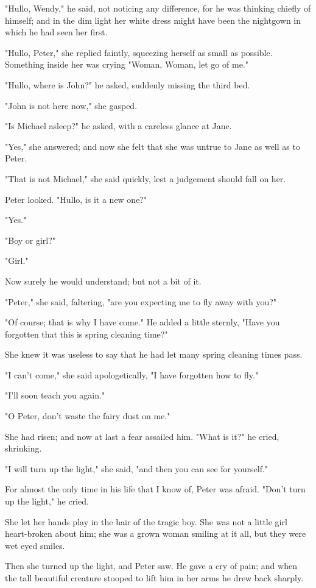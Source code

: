 "Hullo, Wendy," he said, not noticing any difference,
for he was thinking chiefly of himself;
and in the dim light her white dress might have been the nightgown in which he had seen her first.

"Hullo, Peter," she replied faintly, squeezing herself as small as possible.
Something inside her was crying "Woman, Woman, let go of me."

"Hullo, where is John?\@" he asked, suddenly missing the third bed.

"John is not here now," she gasped.

"Is Michael asleep?\@" he asked, with a careless glance at Jane.

"Yes," she answered;
and now she felt that she was untrue to Jane as well as to Peter.

"That is not Michael," she said quickly,
lest a judgement should fall on her.

Peter looked.
"Hullo, is it a new one?"

"Yes."

"Boy or girl?"

"Girl."

Now surely he would understand;
but not a bit of it.

"Peter," she said, faltering, "are you expecting me to fly away with you?"

"Of course;
that is why I have come."
He added a little sternly,
"Have you forgotten that this is spring cleaning time?"

She knew it was useless to say that he had let many spring cleaning times pass.

"I can't come," she said apologetically,
"I have forgotten how to fly."

"I'll soon teach you again."

"O Peter, don't waste the fairy dust on me."

She had risen;
and now at last a fear assailed him.
"What is it?\@" he cried, shrinking.

"I will turn up the light," she said, "and then you can see for yourself."

For almost the only time in his life that I know of, Peter was afraid.
"Don't turn up the light," he cried.

She let her hands play in the hair of the tragic boy.
She was not a little girl heart-broken about him;
she was a grown woman smiling at it all,
but they were wet eyed smiles.

Then she turned up the light, and Peter saw.
He gave a cry of pain;
and when the tall beautiful creature stooped to lift him in her arms he drew back sharply.

